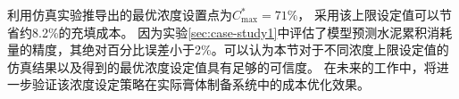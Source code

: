 
利用仿真实验推导出的最优浓度设置点为$C^*_{\max}=71\%$，
采用该上限设定值可以节省约8.2\%的充填成本。
因为实验\ref{sec:case-study1}中评估了模型预测水泥累积消耗量的精度，其绝对百分比误差小于2\%。可以认为本节对于不同浓度上限设定值的仿真结果以及得到的最优浓度设定值具有足够的可信度。
在未来的工作中，将进一步验证该浓度设定策略在实际膏体制备系统中的成本优化效果。







